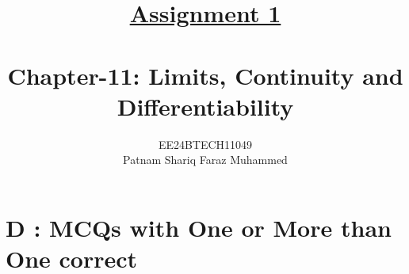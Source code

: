 \documentclass[journal,12pt,twocolumn]{IEEEtran}
\theoremstyle{remark}
\begin{document}


\title{{\uline{Assignment 1 \\ } \\}Chapter-11: Limits, Continuity and Differentiability}
\author{{EE24BTECH11049 \\ Patnam Shariq Faraz Muhammed}}

 
\maketitle
\newpage
\bigskip

\renewcommand{\thefigure}{\theenumi}
\renewcommand{\thetable}{\theenumi}

\section*{D : MCQs with One or More than One correct}
\end{document}
